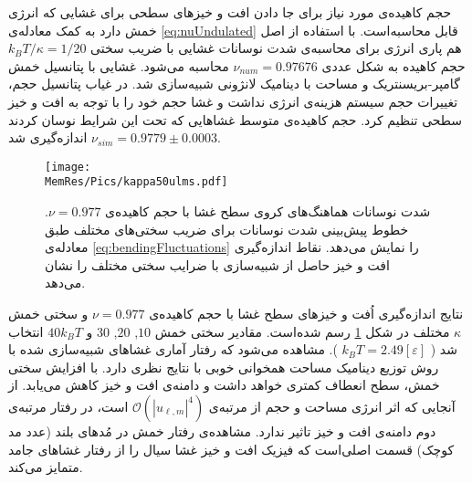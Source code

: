 حجم کاهیده‌ی مورد نیاز برای جا دادن افت‌ و خیز‌های سطحی برای غشایی که انرژی خمش دارد به کمک معادله‌ی 
\ref{eq:nuUndulated}
قابل محاسبه‌است. با استفاده از اصل هم پاری انرژی برای محاسبه‌ی شدت نوسانات  غشایی با ضریب سختی 
$k_BT/\kappa=1/20$
حجم کاهیده به شکل عددی
$\nu_{num}=0.97676$
محاسبه‌ می‌شود. غشایی با پتانسیل خمش گامپر-بریسنتریک و مساحت با دینامیک لانژونی شبیه‌سازی شد. در غیاب پتانسیل حجم، تغییرات حجم سیستم هزینه‌ی انرژی نداشت و غشا حجم خود را با توجه به افت و خیز سطحی تنظیم کرد. حجم کاهیده‌ی  متوسط غشاهایی که تحت این شرایط نوسان کردند 
$\nu_{sim}=0.9779\pm0.0003$
اندازه‌گیری شد. 

\begin{figure}[htbp]
\begin{center}
\texttt{[image: \\MemRes/Pics/kappa50ulms.pdf]}
\caption{
شدت نوسانات هماهنگ‌های کروی سطح غشا با حجم کاهیده‌ی 
$\nu=0.977$.
خطوط پیش‌بینی شدت‌ نوسانات برای ضریب سختی‌های مختلف طبق معادله‌ی
\ref{eq:bendingFluctuations}
را نمایش می‌دهد. نقاط اندازه‌گیری افت و خیز حاصل از شبیه‌سازی با ضرایب سختی مختلف را نشان می‌دهد.
}
\label{fig:kappaULMS}
\end{center}
\end{figure}


نتایج اندازه‌گیری اُفت و خیز‌های سطح غشا با حجم کاهیده‌ی 
$\nu=0.977$
و سختی خمش
$\kappa$
مختلف در شکل
\ref{fig:kappaULMS}
رسم شده‌است. مقادیر سختی خمش 
$10$, $20$, $30$
و
$40k_BT$
انتخاب شد (
$k_BT=2.49[\varepsilon]$
). مشاهده می‌شود که رفتار آماری غشاهای شبیه‌سازی شده با روش توزیع دینامیک مساحت همخوانی خوبی با نتایج نظری دارد.  با افزایش سختی خمش، سطح انعطاف کمتری خواهد داشت و دامنه‌ی افت و خیز کاهش می‌یابد. از آنجایی که اثر انرژی مساحت و حجم از مرتبه‌ی 
$\mathcal{O}(|u_{\ell,m}|^4)$
است، در رفتار مرتبه‌ی دوم دامنه‌ی افت و خیز تاثیر ندارد. مشاهده‌ی رفتار خمش در مُدهای بلند (عدد مد کوچک) قسمت اصلی‌است که فیزیک افت و خیز غشا سیال را از رفتار غشا‌های جامد متمایز می‌کند. 










